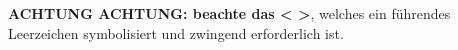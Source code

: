 \textbf{ACHTUNG ACHTUNG: beachte das < >}, welches ein führendes Leerzeichen
symbolisiert und zwingend erforderlich ist.







%
%
%
%
%
%
%
%
%
%
%
%
%
%
%
%
%
%
%
%
%
%
%
%
%
%
%
%
%
%
%
%
%
%
%
%



